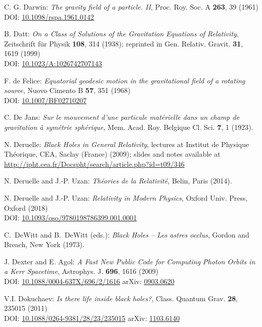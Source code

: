 \begin{thebibliography}{123}
C. G. Darwin: {\em The gravity field of a particle. II},
Proc. Roy. Soc. A {\bf 263}, 39 (1961)\\
DOI: \href{https://doi.org/10.1098/rspa.1961.0142}{10.1098/rspa.1961.0142}

B. Datt:
{\em On a Class of Solutions of the Gravitation Equations of Relativity},
Zeitschrift für Physik {\bf 108}, 314 (1938);
reprinted in Gen. Relativ. Gravit. {\bf 31}, 1619 (1999)\\
DOI: \href{https://doi.org/10.1023/A:1026742707143}{10.1023/A:1026742707143}

F. de Felice:
{\em Equatorial geodesic motion in the gravitational field of a rotating source},
Nuovo Cimento B {\bf 57}, 351 (1968)\\
DOI: \href{https://doi.org/10.1007/BF02710207}{10.1007/BF02710207}

C. De Jans:
\emph{Sur le mouvement d'une particule matérielle dans un champ de gravitation à symétrie sphérique},
Mem. Acad. Roy. Belgique Cl. Sci. {\bf 7}, 1 (1923).

N. Deruelle: {\em Black Holes in General Relativity}, lectures at
Institut de Physique Théorique, CEA, Saclay (France) (2009); slides and notes
available at \\
\url{http://ipht.cea.fr/Docspht/search/article.php?id=t09/346}

N. Deruelle and J.-P. Uzan: {\em Th\'eories de la Relativit\'e},
Belin, Paris (2014).

N. Deruelle and J.-P. Uzan: {\em Relativity in Modern Physics},
Oxford Univ. Press, Oxford (2018)\\
DOI: \href{https://doi.org/10.1093/oso/9780198786399.001.0001}{10.1093/oso/9780198786399.001.0001}

C.~DeWitt and B.~DeWitt (eds.):
{\em Black Holes -- Les astres occlus},
Gordon and Breach, New York (1973).

J. Dexter and E. Agol:
{\em A Fast New Public Code for Computing Photon Orbits in a Kerr Spacetime},
Astrophys. J. {\bf 696}, 1616 (2009)\\
DOI: \href{https://doi.org/10.1088/0004-637X/696/2/1616}{10.1088/0004-637X/696/2/1616}\hfill
arXiv: \href{https://arxiv.org/abs/0903.0620}{0903.0620}

V.I. Dokuchaev: {\em Is there life inside black holes?},
Class. Quantum Grav. {\bf 28}, 235015 (2011)\\
DOI: \href{https://doi.org/10.1088/0264-9381/28/23/235015}{10.1088/0264-9381/28/23/235015}\hfill
arXiv: \href{https://arxiv.org/abs/1103.6140}{1103.6140}


\end{thebibliography}

